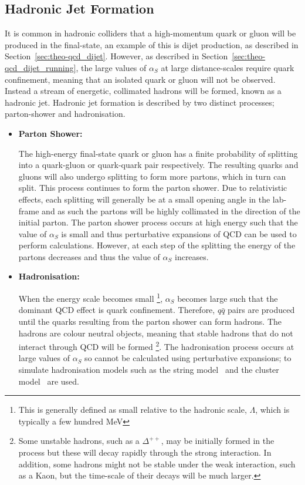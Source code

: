 \subsection{Hadronic Jet Formation}
\label{sec:theo-qcd_jets}

It is common in hadronic colliders that a high-momentum quark or gluon will be produced in the final-state,
an example of this is dijet production, as described in Section~\ref{sec:theo-qcd_dijet}.
However, as described in Section~\ref{sec:theo-qcd_dijet_running},
the large values of $\alpha_S$ at large distance-scales require quark confinement, meaning that an isolated quark or gluon will not be observed.
Instead a stream of energetic, collimated hadrons will be formed, known as a hadronic jet.
Hadronic jet formation is described by two distinct processes; parton-shower and hadronisation.

\begin{itemize}[leftmargin=*]
  
\item\textbf{Parton Shower:}

  The high-energy final-state quark or gluon has a finite probability of splitting into a quark-gluon or quark-quark pair respectively.
  The resulting quarks and gluons will also undergo splitting to form more partons,
  which in turn can split. This process continues to form the parton shower.
  Due to relativistic effects, each splitting will generally be at a small opening angle in the lab-frame
  and as such the partons will be highly collimated in the direction of the initial parton.
  The parton shower process occurs at high energy such that the value of $\alpha_S$ is small
  and thus perturbative expansions of QCD can be used to perform calculations.
  However, at each step of the splitting the energy of the partons decreases
  and thus the value of $\alpha_S$ increases.\\
  
\item\textbf{Hadronisation:}
  
  When the energy scale becomes small
  \footnote{This is generally defined as small relative to the hadronic scale, $\Lambda$, which is typically a few hundred MeV},
  $\alpha_S$ becomes large such that the dominant QCD effect is quark confinement.
  Therefore, $q\bar{q}$ pairs are produced until the quarks resulting from the parton shower can form hadrons.
  The hadrons are colour neutral objects, meaning that stable hadrons that do not interact through QCD will be formed
  \footnote{Some unstable hadrons, such as a $\Delta^{++}$, may be initially formed in the process but these will decay rapidly through the strong interaction.
    In addition, some hadrons might not be stable under the weak interaction, such as a Kaon, but the time-scale of their decays will be much larger.}.
  The hadronisation process occurs at large values of $\alpha_S$ so cannot be calculated using perturbative expansions;
  to simulate hadronisation models such as the string model~\cite{theo-qcd_jet_string} and the
  cluster model~\cite{theo-qcd_jet_cluster} are used.

\end{itemize}
  
